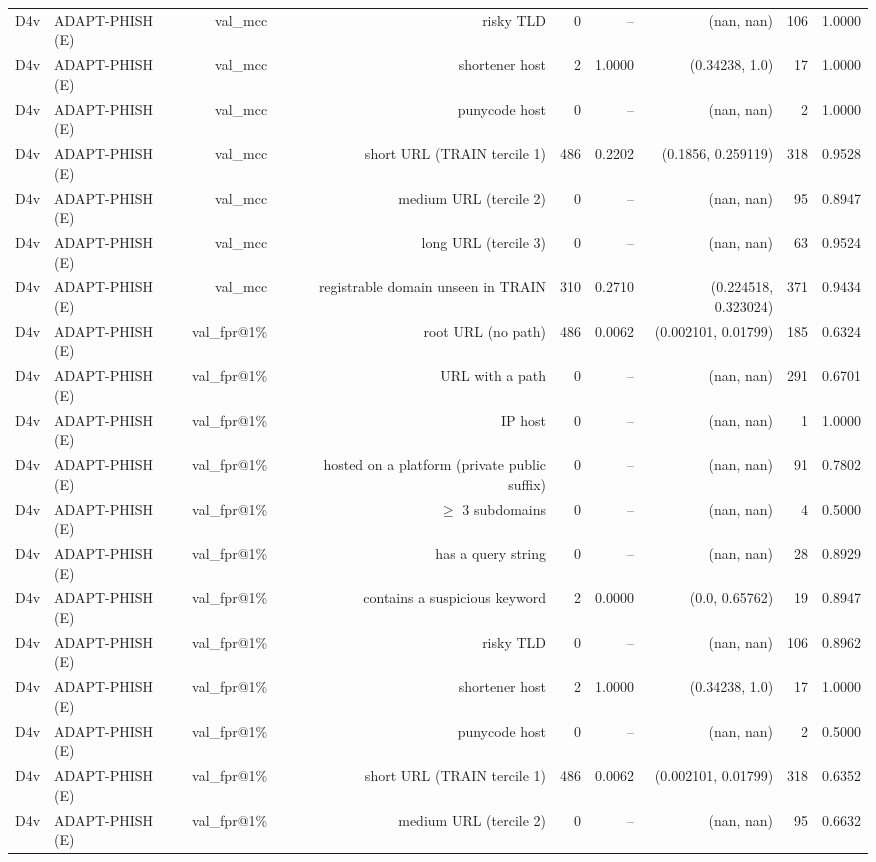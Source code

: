 \begin{table}[t]
\begin{tabular}{llrrrrrrr}
D4v & ADAPT-PHISH (E) & val\_mcc & risky TLD & 0 & -- & (nan, nan) & 106 & 1.0000 \\
D4v & ADAPT-PHISH (E) & val\_mcc & shortener host & 2 & 1.0000 & (0.34238, 1.0) & 17 & 1.0000 \\
D4v & ADAPT-PHISH (E) & val\_mcc & punycode host & 0 & -- & (nan, nan) & 2 & 1.0000 \\
D4v & ADAPT-PHISH (E) & val\_mcc & short URL (TRAIN tercile 1) & 486 & 0.2202 & (0.1856, 0.259119) & 318 & 0.9528 \\
D4v & ADAPT-PHISH (E) & val\_mcc & medium URL (tercile 2) & 0 & -- & (nan, nan) & 95 & 0.8947 \\
D4v & ADAPT-PHISH (E) & val\_mcc & long URL (tercile 3) & 0 & -- & (nan, nan) & 63 & 0.9524 \\
D4v & ADAPT-PHISH (E) & val\_mcc & registrable domain unseen in TRAIN & 310 & 0.2710 & (0.224518, 0.323024) & 371 & 0.9434 \\
D4v & ADAPT-PHISH (E) & val\_fpr@1\% & root URL (no path) & 486 & 0.0062 & (0.002101, 0.01799) & 185 & 0.6324 \\
D4v & ADAPT-PHISH (E) & val\_fpr@1\% & URL with a path & 0 & -- & (nan, nan) & 291 & 0.6701 \\
D4v & ADAPT-PHISH (E) & val\_fpr@1\% & IP host & 0 & -- & (nan, nan) & 1 & 1.0000 \\
D4v & ADAPT-PHISH (E) & val\_fpr@1\% & hosted on a platform (private public suffix) & 0 & -- & (nan, nan) & 91 & 0.7802 \\
D4v & ADAPT-PHISH (E) & val\_fpr@1\% & $\geq$ 3 subdomains & 0 & -- & (nan, nan) & 4 & 0.5000 \\
D4v & ADAPT-PHISH (E) & val\_fpr@1\% & has a query string & 0 & -- & (nan, nan) & 28 & 0.8929 \\
D4v & ADAPT-PHISH (E) & val\_fpr@1\% & contains a suspicious keyword & 2 & 0.0000 & (0.0, 0.65762) & 19 & 0.8947 \\
D4v & ADAPT-PHISH (E) & val\_fpr@1\% & risky TLD & 0 & -- & (nan, nan) & 106 & 0.8962 \\
D4v & ADAPT-PHISH (E) & val\_fpr@1\% & shortener host & 2 & 1.0000 & (0.34238, 1.0) & 17 & 1.0000 \\
D4v & ADAPT-PHISH (E) & val\_fpr@1\% & punycode host & 0 & -- & (nan, nan) & 2 & 0.5000 \\
D4v & ADAPT-PHISH (E) & val\_fpr@1\% & short URL (TRAIN tercile 1) & 486 & 0.0062 & (0.002101, 0.01799) & 318 & 0.6352 \\
D4v & ADAPT-PHISH (E) & val\_fpr@1\% & medium URL (tercile 2) & 0 & -- & (nan, nan) & 95 & 0.6632 \\

\end{tabular}
\end{table}
